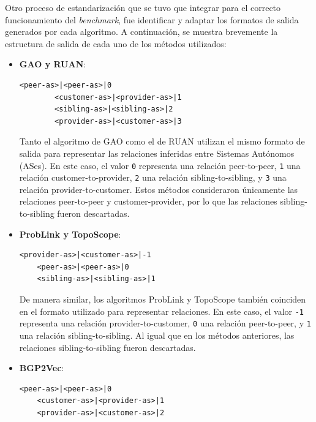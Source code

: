 Otro proceso de estandarización que se tuvo que integrar para el correcto funcionamiento del \textit{benchmark}, fue identificar y adaptar los formatos de salida generados por cada algoritmo. A continuación, se muestra  brevemente la estructura de salida de cada uno de los métodos utilizados:\\

\begin{itemize}
\item \textbf{GAO y RUAN}:

    {
    \renewcommand{\lstlistingname}{Formato}
        \begin{lstlisting}[caption=Formato de salida del algoritmo GAO y RUAN., label=code:formato_salida_gao_ruan]
        <peer-as>|<peer-as>|0
        <customer-as>|<provider-as>|1
        <sibling-as>|<sibling-as>|2
        <provider-as>|<customer-as>|3
        \end{lstlisting}
    }

    Tanto el algoritmo de GAO como el de RUAN utilizan el mismo formato de salida para representar las relaciones inferidas entre Sistemas Autónomos (ASes). En este caso, el valor \texttt{0} representa una relación peer-to-peer, \texttt{1} una relación customer-to-provider, \texttt{2} una relación sibling-to-sibling, y \texttt{3} una relación provider-to-customer. Estos métodos consideraron únicamente las relaciones peer-to-peer y customer-provider, por lo que las relaciones sibling-to-sibling fueron descartadas.

\item \textbf{ProbLink y TopoScope}:
    {
    \renewcommand{\lstlistingname}{Formato}
    \begin{lstlisting}[caption=Formato de salida del algoritmo ProbLink y TopoScope. , label=code:formato_salida_problink]
    <provider-as>|<customer-as>|-1
    <peer-as>|<peer-as>|0
    <sibling-as>|<sibling-as>|1
    \end{lstlisting}
    }
    De manera similar, los algoritmos ProbLink y TopoScope también coinciden en el formato utilizado para representar relaciones. En este caso, el valor \texttt{-1} representa una relación provider-to-customer, \texttt{0} una relación peer-to-peer, y \texttt{1} una relación sibling-to-sibling. Al igual que en los métodos anteriores, las relaciones sibling-to-sibling fueron descartadas.

\item \textbf{BGP2Vec}:
    {
    \renewcommand{\lstlistingname}{Formato}
    \begin{lstlisting}[caption=Formato de salida de nuestro formato estandar definido. , label=code:formato_salida_estandar_mia]
    <peer-as>|<peer-as>|0
    <customer-as>|<provider-as>|1
    <provider-as>|<customer-as>|2
    \end{lstlisting}
    }


\end{itemize}
